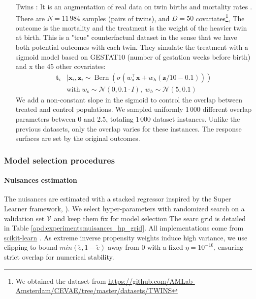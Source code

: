 \documentclass[a4paper,num-refs]{oup-contemporary}%
\begin{document}
\begin{itemize}
    \item[Twins] \cite{louizos_causal_2017}: It is an augmentation of
        real data on twin births and mortality rates
        \cite{almond_costs_2005}. There are $N=11\,984$ samples (pairs of twins),
        and $D=50$ covariates\footnote{We obtained the dataset from
            \href{https://github.com/AMLab-Amsterdam/CEVAE/tree/master/datasets/TWINS}{https://github.com/AMLab-Amsterdam/CEVAE/tree/master/datasets/TWINS}}, The outcome is the mortality and the treatment is the
        weight of the heavier twin at birth. This is a "true" counterfactual dataset
        \cite{curth_really_2021} in the sense that we have
        both potential outcomes with each twin. They simulate the treatment with a
        sigmoid model based on GESTAT10 (number of gestation weeks before birth) and x
        the 45 other covariates:
        \begin{align}
            \mathbf{t}_{i} & \mid \mathbf{x}_{i}, \mathbf{z}_{i} \sim
            \operatorname{Bern}\left(\sigma\left(w_{o}^{\top}
            \mathbf{x}+w_{h}(\mathbf{z} / 10-0.1)\right)\right)       \\ & \text{with} \;
            w_{o} \sim \mathcal{N}(0,0.1 \cdot I),\; w_{h} \sim \mathcal{N}(5,0.1) \nonumber
        \end{align}
        We add a non-constant slope in the
        sigmoid to control the overlap between
        treated and control populations.
        We sampled uniformly 1\,000 different overlap parameters between 0 and
        2.5, totaling 1\,000 dataset instances. Unlike the previous datasets,
        only the overlap varies for these instances. The response surfaces are
        set by the original outcomes.
\end{itemize}

\subsubsection{Model selection procedures}

\paragraph{Nuisances estimation}\label{apd:experiments:nuisances_hp}

The nuisances are estimated with a stacked regressor inspired by the Super
Learner framework, \cite{laan_super_2007}). We select hyper-parameters
with randomized search on a validation set $\mathcal{V}$ and keep them fix for
model selection  The searc grid is detailed in Table
\ref{apd:experiments:nuisances_hp_grid}. All implementations come from
\href{https://scikit-learn.org/stable/}{scikit-learn}
\cite{pedregosa_scikitlearn_2011}.  As extreme inverse propensity weights induce
high variance, we use clipping \cite{swaminathan_counterfactual_2015,
    ionides_truncated_2008} to bound $min(\check e, 1-\check e)$ away from 0 with a
fixed $\eta=10^{-10}$, ensuring strict overlap for numerical stability.
\end{document}
